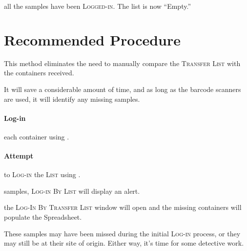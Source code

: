 
 all the samples have been \textsc{Logged-in}. The list is now ``Empty.''

\section{Recommended Procedure}\label{sec:login_workflow}
This method eliminates the need to manually compare the \textsc{Transfer List} with the containers received.

It will save a considerable amount of time, and as long as the barcode scanners are used, it will identify any missing samples.

\paragraph{Log-in} each container using .

\paragraph{Attempt} to \textsc{Log-in} the \textsc{List} using .

 samples, \textsc{Log-in By List} will display an alert.\\



 the \textsc{Log-In By Transfer List} window will open and the missing containers will populate the Spreadsheet.\\


These samples may have been missed during the initial \textsc{Log-in} process, or they may still be at their site of origin. Either way, it's time for some detective work.